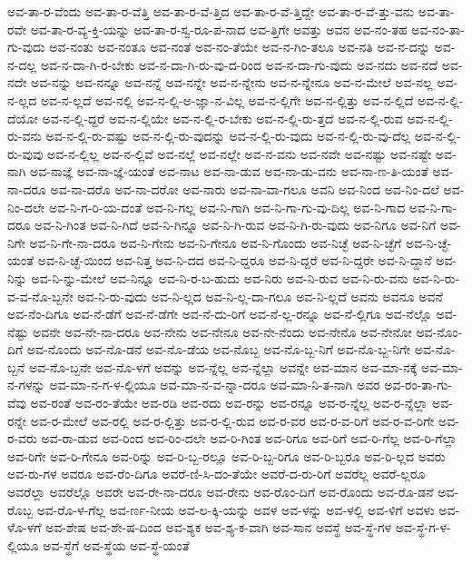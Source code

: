 {ಅವ-ತಾ-ರ-ವೆಂದು
ಅವ-ತಾ-ರ-ವೆತ್ತಿ
ಅವ-ತಾ-ರ-ವೆ-ತ್ತಿದ
ಅವ-ತಾ-ರ-ವೆ-ತ್ತಿದ್ದೇ
ಅವ-ತಾ-ರ-ವೆ-ತ್ತು-ವನು
ಅವ-ತಾ-ರವೇ
ಅವ-ತಾ-ರ-ವ್ಯ-ಕ್ತಿ-ಯನ್ನು
ಅವ-ತಾ-ರ-ಸ್ವ-ರೂ-ಪ-ನಾದ
ಅವ-ತ್ತಿಗೇ
ಅವತ್ತು
ಅವನ
ಅವ-ನಂ-ತಹ
ಅವ-ನಂ-ತಾ-ಗು-ವುದು
ಅವ-ನಂತು
ಅವ-ನಂತೂ
ಅವ-ನಂತೆ
ಅವ-ನಂ-ತೆಯೇ
ಅವ-ನ-ಗಿಂ-ತಲೂ
ಅವ-ನತಿ
ಅವ-ನ-ದನ್ನು
ಅವ-ನ-ದಲ್ಲ
ಅವ-ನ-ದಾ-ಗಿ-ರ-ಬೇಕು
ಅವ-ನ-ದಾ-ಗಿ-ರು-ವು-ದ-ರಿಂದ
ಅವ-ನ-ದಾ-ಗು-ವುದು
ಅವ-ನದು
ಅವ-ನದೆ
ಅವ-ನದೇ
ಅವ-ನನ್ನು
ಅವ-ನನ್ನೂ
ಅವ-ನನ್ನೆ
ಅವ-ನನ್ನೇ
ಅವ-ನ-ನ್ನೇನು
ಅವ-ನ-ನ್ನೇನೂ
ಅವ-ನ-ಮೇಲೆ
ಅವ-ನಲ್ಲ
ಅವ-ನ-ಲ್ಲದ
ಅವ-ನ-ಲ್ಲದೆ
ಅವ-ನಲ್ಲಿ
ಅವ-ನ-ಲ್ಲಿ-ಅ-ಜ್ಞಾ-ನ-ವಿಲ್ಲ
ಅವ-ನ-ಲ್ಲಿಗೇ
ಅವ-ನ-ಲ್ಲಿತ್ತು
ಅವ-ನ-ಲ್ಲಿದೆ
ಅವ-ನ-ಲ್ಲಿ-ದೆಯೋ
ಅವ-ನ-ಲ್ಲಿ-ದ್ದರೆ
ಅವ-ನ-ಲ್ಲಿಯೇ
ಅವ-ನ-ಲ್ಲಿ-ರ-ಬೇಕು
ಅವ-ನ-ಲ್ಲಿ-ರು-ತ್ತದೆ
ಅವ-ನ-ಲ್ಲಿ-ರುವ
ಅವ-ನ-ಲ್ಲಿ-ರು-ವನು
ಅವ-ನ-ಲ್ಲಿ-ರು-ವಷ್ಟು
ಅವ-ನ-ಲ್ಲಿ-ರು-ವುದನ್ನು
ಅವ-ನ-ಲ್ಲಿ-ರು-ವುದು
ಅವ-ನ-ಲ್ಲಿ-ರು-ವು-ದೆಲ್ಲ
ಅವ-ನ-ಲ್ಲಿ-ರು-ವುವು
ಅವ-ನ-ಲ್ಲಿಲ್ಲ
ಅವ-ನ-ಲ್ಲಿವೆ
ಅವ-ನಲ್ಲೆ
ಅವ-ನಲ್ಲೇ
ಅವ-ನ-ವನು
ಅವ-ನವೇ
ಅವ-ನಷ್ಟು
ಅವ-ನಷ್ಟೇ
ಅವ-ನಾಗಿ
ಅವ-ನಾಜ್ಞೆ
ಅವ-ನಾ-ಜ್ಞೆ-ಯಂತೆ
ಅವ-ನಾಟ
ಅವ-ನಾ-ಡುವ
ಅವ-ನಾ-ಡು-ವನು
ಅವ-ನಾ-ಣ-ತಿ-ಯಂತೆ
ಅವ-ನಾ-ದರೂ
ಅವ-ನಾ-ದರೊ
ಅವ-ನಾ-ದರೋ
ಅವ-ನಾರು
ಅವ-ನಾ-ವಾ-ಗಲೂ
ಅವನಿ
ಅವ-ನಿಂದ
ಅವ-ನಿಂ-ದಲೆ
ಅವ-ನಿಂ-ದಲೇ
ಅವ-ನಿ-ಗ-ರಿ-ಯ-ದಂತೆ
ಅವ-ನಿ-ಗಲ್ಲ
ಅವ-ನಿ-ಗಾಗಿ
ಅವ-ನಿ-ಗಾ-ಗು-ವು-ದಿಲ್ಲ
ಅವ-ನಿ-ಗಾದ
ಅವ-ನಿ-ಗಾ-ದರೂ
ಅವ-ನಿ-ಗಿಂತ
ಅವ-ನಿ-ಗಿದೆ
ಅವ-ನಿ-ಗಿನ್ನೂ
ಅವ-ನಿ-ಗಿ-ರುವ
ಅವ-ನಿ-ಗಿ-ರು-ವುದು
ಅವ-ನಿಗೂ
ಅವ-ನಿಗೆ
ಅವ-ನಿಗೇ
ಅವ-ನಿ-ಗೇ-ನಾ-ದರೂ
ಅವ-ನಿ-ಗೇನು
ಅವ-ನಿ-ಗೇನೂ
ಅವ-ನಿ-ಗೊಂದು
ಅವ-ನಿಚ್ಛೆ
ಅವ-ನಿ-ಚ್ಛೆಗೆ
ಅವ-ನಿ-ಚ್ಛೆ-ಯಂತೆ
ಅವ-ನಿ-ಚ್ಛೆ-ಯಿಂದ
ಅವ-ನಿತ್ತ
ಅವ-ನಿ-ದದ
ಅವ-ನಿ-ದ್ದರೂ
ಅವ-ನಿ-ದ್ದರೆ
ಅವ-ನಿ-ದ್ದರೇ
ಅವ-ನಿ-ದ್ದಾನೆ
ಅವ-ನಿನ್ನು
ಅವ-ನಿ-ನ್ನು-ಮೇಲೆ
ಅವ-ನಿನ್ನೂ
ಅವ-ನಿ-ರ-ಬ-ಹುದು
ಅವ-ನಿರು
ಅವ-ನಿ-ರುವ
ಅವ-ನಿ-ರು-ವನು
ಅವ-ನಿ-ರು-ವ-ವ-ನೊ-ಬ್ಬನೇ
ಅವ-ನಿ-ರು-ವುದು
ಅವ-ನಿ-ಲ್ಲದ
ಅವ-ನಿ-ಲ್ಲ-ದಾ-ಗಲೂ
ಅವ-ನಿ-ಲ್ಲದೆ
ಅವನು
ಅವನೂ
ಅವನೆ
ಅವ-ನೆಂ-ದಿಗೂ
ಅವ-ನೆ-ಡೆಗೆ
ಅವ-ನೆ-ಡೆಗೇ
ಅವ-ನೆ-ದು-ರಿಗೆ
ಅವ-ನೆ-ಲ್ಲ-ರನ್ನೂ
ಅವ-ನೆ-ಲ್ಲಿಗೂ
ಅವ-ನೆಲ್ಲೊ
ಅವ-ನೆಷ್ಟು
ಅವನೇ
ಅವ-ನೇ-ನಾ-ದರೂ
ಅವ-ನೇನು
ಅವ-ನೇನೂ
ಅವ-ನೇ-ನೆಂದು
ಅವ-ನೇನೊ
ಅವ-ನೇನೋ
ಅವ-ನೊಂ-ದಿಗೆ
ಅವ-ನೊಂದು
ಅವ-ನೊ-ಡನೆ
ಅವ-ನೊ-ಡೆಯ
ಅವ-ನೊಬ್ಬ
ಅವ-ನೊ-ಬ್ಬ-ನಿಗೆ
ಅವ-ನೊ-ಬ್ಬ-ನಿಗೇ
ಅವ-ನೊ-ಬ್ಬನೆ
ಅವ-ನೊ-ಬ್ಬನೇ
ಅವ-ನೊ-ಳಗೆ
ಅವನ್ನು
ಅವ-ನ್ನೆಲ್ಲ
ಅವ-ನ್ನೆಲ್ಲಾ
ಅವನ್ನೇ
ಅವ-ಮಾನ
ಅವ-ಮಾ-ನಕ್ಕೆ
ಅವ-ಮಾ-ನ-ಗಳನ್ನು
ಅವ-ಮಾ-ನ-ಗ-ಳ-ಲ್ಲಿಯೂ
ಅವ-ಮಾ-ನ-ವ-ನ್ನಾ-ದರೂ
ಅವ-ಮಾ-ನಿ-ತ-ನಾಗಿ
ಅವರ
ಅವ-ರಂ-ತಾ-ಗು-ವೆವು
ಅವ-ರಂತೆ
ಅವ-ರಂ-ತೆಯೇ
ಅವ-ರಡಿ
ಅವ-ರದು
ಅವ-ರನ್ನು
ಅವ-ರನ್ನೂ
ಅವ-ರ-ನ್ನೆಲ್ಲ
ಅವ-ರ-ನ್ನೆಲ್ಲಾ
ಅವ-ರನ್ನೇ
ಅವ-ರ-ಮೇಲೆ
ಅವ-ರಲ್ಲಿ
ಅವ-ರ-ಲ್ಲಿತ್ತು
ಅವ-ರ-ಲ್ಲಿ-ರುವ
ಅವ-ರ-ವರ
ಅವ-ರ-ವ-ರಿಗೆ
ಅವ-ರ-ವ-ರಿಗೇ
ಅವ-ರ-ವರು
ಅವ-ರಾ-ಡುವ
ಅವ-ರಿಂದ
ಅವ-ರಿಂ-ದಲೇ
ಅವ-ರಿ-ಗಿಂತ
ಅವ-ರಿಗೂ
ಅವ-ರಿಗೆ
ಅವ-ರಿ-ಗೆಲ್ಲ
ಅವ-ರಿ-ಗೆಲ್ಲಾ
ಅವ-ರಿಗೇ
ಅವ-ರಿ-ಗೇನೂ
ಅವ-ರಿನ್ನು
ಅವ-ರಿ-ಬ್ಬ-ರಲ್ಲೂ
ಅವ-ರಿ-ಬ್ಬ-ರಿಗೂ
ಅವ-ರಿ-ಬ್ಬರೂ
ಅವ-ರಿ-ಲ್ಲದ
ಅವರು
ಅವ-ರು-ಗಳ
ಅವರೂ
ಅವ-ರೆಂ-ದಿಗೂ
ಅವರೆ-ಣಿ-ಸಿ-ದಂ-ತೆಯೇ
ಅವರೆ-ದ-ರು-ರಿಗೆ
ಅವರೆಲ್ಲ
ಅವರೆ-ಲ್ಲರೂ
ಅವರೆಲ್ಲಾ
ಅವರೆಲ್ಲೊ
ಅವರೇ
ಅವ-ರೇ-ನಾ-ದರೂ
ಅವ-ರೇನು
ಅವ-ರೊಂ-ದಿಗೆ
ಅವ-ರೊಂದು
ಅವ-ರೊ-ಡನೆ
ಅವ-ರೊಬ್ಬ
ಅವ-ರೊ-ಳ-ಗೆಲ್ಲ
ಅವ-ರ್ಣ-ನೀಯ
ಅವ-ಲ-ಕ್ಕಿ-ಯನ್ನು
ಅವಳ
ಅವ-ಳನ್ನು
ಅವ-ಳಲ್ಲಿ
ಅವ-ಳಿಗೆ
ಅವಳು
ಅವ-ಳೊ-ಳಗೆ
ಅವ-ಶೇಷ
ಅವ-ಶೇ-ಷ-ದಿಂದ
ಅವ-ಶ್ಯಕ
ಅವ-ಶ್ಯ-ಕ-ವಾಗಿ
ಅವ-ಸಾನ
ಅವಸ್ಥೆ
ಅವ-ಸ್ಥೆ-ಗಳ
ಅವ-ಸ್ಥೆ-ಗ-ಳ-ಲ್ಲಿಯೂ
ಅವ-ಸ್ಥೆಗೆ
ಅವ-ಸ್ಥೆಯ
ಅವ-ಸ್ಥೆ-ಯಂತೆ
}
